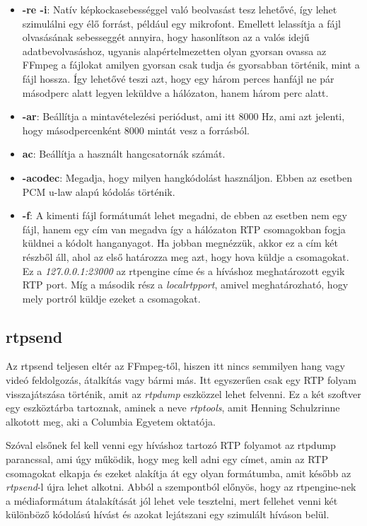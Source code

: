 \begin{itemize}
	\item \textbf{-re -i}: Natív képkockasebességgel való beolvasást tesz lehetővé, 
	így lehet szimulálni egy élő forrást, például egy mikrofont. Emellett lelassítja
	a fájl olvasásának sebesseggét annyira, hogy hasonlítson az a valós idejű
	adatbevolvasáshoz, ugyanis alapértelmezetten olyan gyorsan ovassa az FFmpeg a
	fájlokat amilyen gyorsan csak tudja és gyorsabban történik, mint a fájl hossza. 
	Így lehetővé teszi azt, hogy egy három perces hanfájl ne pár másodperc alatt 
	legyen leküldve a hálózaton, hanem három perc alatt. 
	\item \textbf{-ar}: Beállítja a mintavételezési periódust, ami itt 8000 Hz, ami 
	azt jelenti, hogy másodpercenként 8000 mintát vesz a forrásból. 
	\item \textbf{ac}: Beállítja a használt hangcsatornák számát.
	\item \textbf{-acodec}: Megadja, hogy milyen hangkódolást használjon. Ebben az 
	esetben PCM u-law alapú kódolás történik.
	\item \textbf{-f}: A kimenti fájl formátumát lehet megadni, de ebben az esetben
	nem egy fájl, hanem egy cím van megadva így a hálózaton RTP csomagokban fogja 
	küldnei a kódolt hanganyagot. Ha jobban megnézzük, akkor ez a cím két részből áll,
	ahol az első határozza meg azt, hogy hova küldje a csomagokat. Ez a 
	\textit{127.0.0.1:23000} az rtpengine címe és a híváshoz meghatározott egyik RTP
	port. Míg a második rész a \textit{localrtpport}, amivel meghatározható, hogy
	mely portról küldje ezeket a csomagokat.
\end{itemize}

\subsection{rtpsend}

Az rtpsend teljesen eltér az FFmpeg-től, hiszen itt nincs semmilyen hang vagy videó
feldolgozás, átalkítás vagy bármi más. Itt egyszerűen csak egy RTP folyam visszajátszása
történik, amit az \textit{rtpdump} eszközzel lehet felvenni. Ez a két szoftver egy 
eszköztárba tartoznak, aminek a neve \textit{rtptools}, amit Henning Schulzrinne
alkotott meg, aki a Columbia Egyetem oktatója.

Szóval elsőnek fel kell venni egy híváshoz tartozó RTP folyamot az rtpdump parancssal,
ami úgy működik, hogy meg kell adni egy címet, amin az RTP csomagokat elkapja és 
ezeket alakítja át egy olyan formátumba, amit később az \textit{rtpsend}-l újra
lehet alkotni. Abból a szempontból előnyös, hogy az rtpengine-nek a médiaformátum
átalakítását jól lehet vele tesztelni, mert fellehet venni két különböző kódolású
hívást és azokat lejátszani egy szimulált híváson belül.

